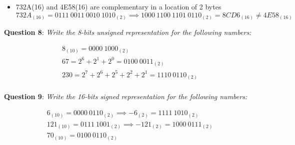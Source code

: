 \documentclass{article}
\newcommand{\question}[2][]{\begin{flushleft}
        \textbf{Question #1}: \textit{#2}


\end{flushleft}}
\begin{document}
\begin{itemize}
			\item 732A(16)  and 4E58(16) are complementary in a location of 2 bytes
			\begin{equation*}
				732A_{(16)} = 0111\ 0011\ 0010\ 1010_{(2)} \implies 1000\ 1100\ 1101\ 0110_{(2)} = 8CD6_{(16)} \neq 4E58_{(16)}
			\end{equation*}
		\end{itemize}



	\question[8]{Write the 8-bits unsigned representation for the following numbers:}
	\begin{gather*}
		8_{(10)} = 0000\ 1000_{(2)} \\
		67 = 2^6 + 2^1 + 2^0 = 0100\ 0011_{(2)} \\
		230 = 2^7 + 2^6 + 2^5 + 2^2 + 2^1 = 1110\ 0110_{(2)} \\
	\end{gather*}

	\question[9]{Write the 16-bits signed representation for the following numbers:}
	\begin{gather*}
		6_{(10)} = 0000\ 0110_{(2)} \implies -6_{(2)} = 1111\ 1010_{(2)} \\
		121_{(10)} = 0111\ 1001_{(2)} \implies -121_{(2)} = 1000\ 0111_{(2)} \\
		70_{(10)} = 0100\ 0110_{(2)}
	\end{gather*}
\end{document}
